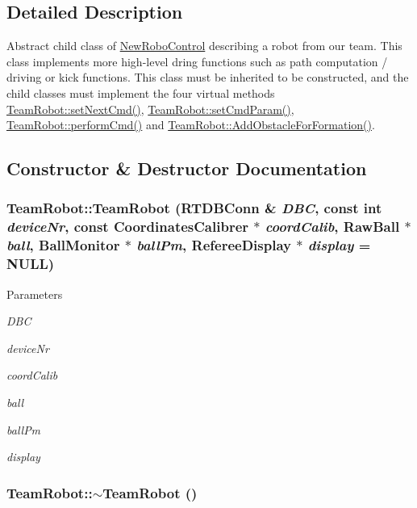\subsection{Detailed Description}
Abstract child class of \hyperlink{classNewRoboControl}{NewRoboControl} describing a robot from our team. This class implements more high-\/level dring functions such as path computation / driving or kick functions. This class must be inherited to be constructed, and the child classes must implement the four virtual methods \hyperlink{classTeamRobot_a65f9a2b7464dfac3f4a0336810cf574f}{TeamRobot::setNextCmd()}, \hyperlink{classTeamRobot_a34c0fd6986c510d4025e5752b3c0e49a}{TeamRobot::setCmdParam()}, \hyperlink{classTeamRobot_a9b84df51ca16a7203fdb6498ea6741da}{TeamRobot::performCmd()} and \hyperlink{classTeamRobot_a71ec65db46db1ac511fe17b668d4f192}{TeamRobot::AddObstacleForFormation()}. 

\subsection{Constructor \& Destructor Documentation}
\hypertarget{classTeamRobot_a4b116f58f0a1568a886d03b0c71df20c}{
\subsubsection[{TeamRobot}]{\setlength{\rightskip}{0pt plus 5cm}TeamRobot::TeamRobot (RTDBConn \& {\em DBC}, \/  const int {\em deviceNr}, \/  const {\bf CoordinatesCalibrer} $\ast$ {\em coordCalib}, \/  RawBall $\ast$ {\em ball}, \/  {\bf BallMonitor} $\ast$ {\em ballPm}, \/  {\bf RefereeDisplay} $\ast$ {\em display} = {\ttfamily NULL})}}
\label{classTeamRobot_a4b116f58f0a1568a886d03b0c71df20c}

\begin{DoxyParams}{Parameters}
\item[{\em DBC}]\item[{\em deviceNr}]\item[{\em coordCalib}]\item[{\em ball}]\item[{\em ballPm}]\item[{\em display}]\end{DoxyParams}
\hypertarget{classTeamRobot_a7be9d5161b7524cbbb6ae486ad4a1b42}{
\subsubsection[{$\sim$TeamRobot}]{\setlength{\rightskip}{0pt plus 5cm}TeamRobot::$\sim$TeamRobot ()}}
\label{classTeamRobot_a7be9d5161b7524cbbb6ae486ad4a1b42}


